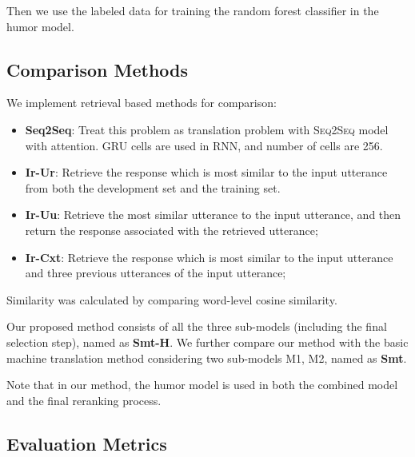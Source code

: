 \documentclass[letterpaper]{article} %
\begin{document}
\begin{CJK*}{UTF8}{gbsn}
Then we use the labeled data for training the random forest classifier in the humor model.

\subsection{Comparison Methods}

We implement retrieval based methods for comparison:
\begin{itemize}
	\item {\sc \textbf{Seq2Seq}}: Treat this problem as translation problem with \textsc{Seq2Seq} model with attention. GRU cells  are used in RNN, and number of cells are 256.
	\item {\sc \textbf{Ir-Ur}}: Retrieve the response which is most similar to the input utterance from both the development set and the training set.
	\item {\sc \textbf{Ir-Uu}}: Retrieve the most similar utterance to the input utterance, and then return the response associated with the retrieved utterance;
	\item {\sc \textbf{Ir-Cxt}}: Retrieve the response which is most similar to the input utterance and three previous utterances of the input utterance;
\end{itemize}

Similarity was calculated by comparing word-level cosine similarity.

Our proposed method consists of all the three sub-models (including the final selection step), named as {\sc \textbf{Smt-H}}. We further compare our method with the basic machine translation method considering two sub-models M1, M2, named as {\sc \textbf{Smt}}. 

Note that in our method, the humor model is used in both the combined model and the final reranking process. %

\subsection{Evaluation Metrics}


\end{CJK*}
\end{document}
